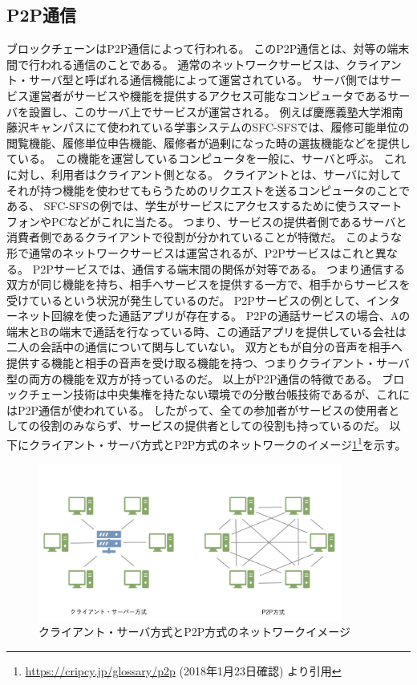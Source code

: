 \subsection{P2P通信}
ブロックチェーンはP2P通信によって行われる。
このP2P通信とは、対等の端末間で行われる通信のことである。
通常のネットワークサービスは、クライアント・サーバ型と呼ばれる通信機能によって運営されている。
サーバ側ではサービス運営者がサービスや機能を提供するアクセス可能なコンピュータであるサーバを設置し、このサーバ上でサービスが運営される。
例えば慶應義塾大学湘南藤沢キャンパスにて使われている学事システムのSFC-SFSでは、履修可能単位の閲覧機能、履修単位申告機能、履修者が過剰になった時の選抜機能などを提供している。
この機能を運営しているコンピュータを一般に、サーバと呼ぶ。
これに対し、利用者はクライアント側となる。
クライアントとは、サーバに対してそれが持つ機能を使わせてもらうためのリクエストを送るコンピュータのことである、
SFC-SFSの例では、学生がサービスにアクセスするために使うスマートフォンやPCなどがこれに当たる。
つまり、サービスの提供者側であるサーバと消費者側であるクライアントで役割が分かれていることが特徴だ。
このような形で通常のネットワークサービスは運営されるが、P2Pサービスはこれと異なる。
P2Pサービスでは、通信する端末間の関係が対等である。
つまり通信する双方が同じ機能を持ち、相手へサービスを提供する一方で、相手からサービスを受けているという状況が発生しているのだ。
P2Pサービスの例として、インターネット回線を使った通話アプリが存在する。
P2Pの通話サービスの場合、Aの端末とBの端末で通話を行なっている時、この通話アプリを提供している会社は二人の会話中の通信について関与していない。
双方ともが自分の音声を相手へ提供する機能と相手の音声を受け取る機能を持つ、つまりクライアント・サーバ型の両方の機能を双方が持っているのだ。
以上がP2P通信の特徴である。
ブロックチェーン技術は中央集権を持たない環境での分散台帳技術であるが、これにはP2P通信が使われている。
したがって、全ての参加者がサービスの使用者としての役割のみならず、サービスの提供者としての役割も持っているのだ。
以下にクライアント・サーバ方式とP2P方式のネットワークのイメージ\ref{P2P}\footnote{\url{https://cripcy.jp/glossary/p2p} (2018年1月23日確認) より引用}を示す。
\begin{figure}[htbp]
 \centering
  \includegraphics[width=100mm]{image/P2P.png}
 \caption{クライアント・サーバ方式とP2P方式のネットワークイメージ}
 \label{P2P}
\end{figure}

